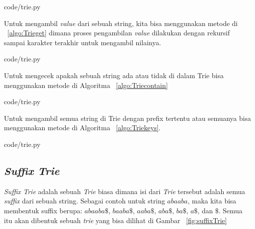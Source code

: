 
                {code/trie.py}

Untuk mengambil \textit{value} dari sebuah string, kita bisa menggunakan metode di ~\ref{algo:Trieget} dimana proses pengambilan \textit{value} dilakukan dengan rekursif sampai karakter terakhir untuk mengambil nilainya.


                {code/trie.py}

Untuk mengecek apakah sebuah string ada atau tidak di dalam Trie bisa menggunakan metode di Algoritma ~\ref{algo:Triecontain}


                {code/trie.py}
								
Untuk mengambil semua string di Trie dengan prefix tertentu atau semuanya bisa menggunakan metode di Algoritma ~\ref{algo:Triekeys}.


                {code/trie.py}

\subsection{\textit{Suffix Trie}}

\textit{Suffix Trie} adalah sebuah \textit{Trie} biasa dimana isi dari \textit{Trie} tersebut adalah semua \textit{suffix} dari sebuah string. Sebagai contoh untuk string $abaaba$, maka kita bisa membentuk suffix berupa: $abaaba\$$, $baaba\$$, $aaba\$$, $aba\$$, $ba\$$, $a\$$, dan $\$$. Semua itu akan dibentuk sebuah \textit{trie} yang bisa dilihat di Gambar ~\ref{fig:suffixTrie}

